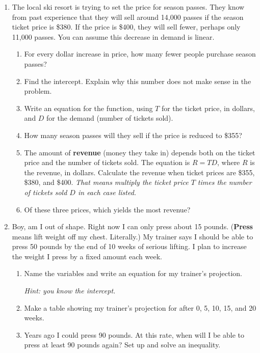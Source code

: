 \begin{enumerate}
\newpage %

\item The local ski resort is trying to set the price for season passes.  They know from past experience that they will sell around 14,000 passes if the season ticket price is \$380.  If the price is \$400, they will sell fewer, perhaps only 11,000 passes.  You can assume this decrease in demand is linear.
\begin{enumerate}
\item For every dollar increase in price, how many fewer people purchase season passes? \vfill
\item Find the intercept.  Explain why this number does not make sense in the problem. \vfill
\item Write an equation for the function, using $T$ for the ticket price, in dollars, and $D$ for the demand (number of tickets sold). \vfill
\item How many season passes will they sell if the price is reduced to \$355? \vfill
\item The amount of \textbf{revenue} (money they take in) depends both on the ticket price and the number of tickets sold.  The equation is $R = TD$, where $R$ is the revenue, in dollars.  Calculate the revenue when ticket prices are \$355, \$380, and \$400.  \emph{That means multiply the ticket price $T$ times the number of tickets sold $D$ in each case listed.}  
\vfill 
\item Of these three prices, which yields the most revenue? \vfill 
\end{enumerate}

\newpage %

\item Boy, am I out of shape.  Right now I can only press about 15 pounds. (\textbf{Press} means lift weight off my chest.  Literally.)  My trainer says I should be able to press 50 pounds by the end of 10 weeks of serious lifting. I plan to increase the weight I press by a fixed amount each week.
\begin{enumerate}
\item Name the variables and write an equation for my trainer's projection. 
  
 \emph{Hint:  you know the intercept.} \vfill
 \item Make a table showing my trainer's projection for after 0, 5, 10, 15, and 20 weeks.
\vfill
\item Years ago I could press 90 pounds. At this rate, when will I be able to press at least 90 pounds again?  Set up and solve an inequality. \vfill


\end{enumerate}
\end{enumerate}
